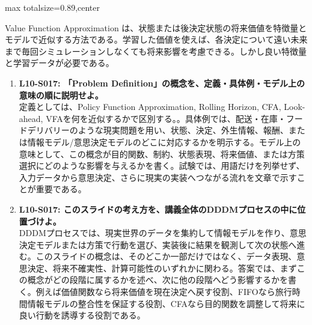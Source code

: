 \begin{minipage}[t]{0.58\textwidth}
\begin{adjustbox}{max totalsize={\textwidth}{0.89\textheight},center}
\begin{minipage}{\textwidth}
Value Function Approximation は、状態または後決定状態の将来価値を特徴量とモデルで近似する方法である。学習した価値を使えば、各決定について遠い未来まで毎回シミュレーションしなくても将来影響を考慮できる。しかし良い特徴量と学習データが必要である。\par{}\begin{enumerate}\item \textbf{L10-S017: 「Problem Definition」の概念を、定義・具体例・モデル上の意味の順に説明せよ。}\\定義としては、Policy Function Approximation, Rolling Horizon, CFA, Look-ahead, VFAを何を近似するかで区別する。。具体例では、配送・在庫・フードデリバリーのような現実問題を用い、状態、決定、外生情報、報酬、または情報モデル/意思決定モデルのどこに対応するかを明示する。モデル上の意味として、この概念が目的関数、制約、状態表現、将来価値、または方策選択にどのような影響を与えるかを書く。試験では、用語だけを列挙せず、入力データから意思決定、さらに現実の実装へつながる流れを文章で示すことが重要である。\item \textbf{L10-S017: このスライドの考え方を、講義全体のDDDMプロセスの中に位置づけよ。}\\DDDMプロセスでは、現実世界のデータを集約して情報モデルを作り、意思決定モデルまたは方策で行動を選び、実装後に結果を観測して次の状態へ進む。このスライドの概念は、そのどこか一部だけではなく、データ表現、意思決定、将来不確実性、計算可能性のいずれかに関わる。答案では、まずこの概念がどの段階に属するかを述べ、次に他の段階へどう影響するかを書く。例えば価値関数なら将来価値を現在決定へ戻す役割、FIFOなら旅行時間情報モデルの整合性を保証する役割、CFAなら目的関数を調整して将来に良い行動を誘導する役割である。\end{enumerate}
\end{minipage}
\end{adjustbox}
\end{minipage}


